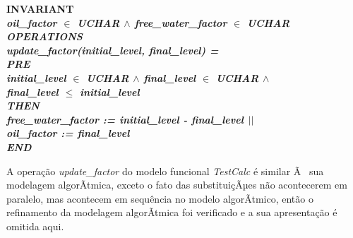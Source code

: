 \documentclass[11pt]{article} %
\begin{document}
\small{
\begin{sloppypar}
\hspace*{-0.30in}\bf INVARIANT\\
\hspace*{0.40in}\it oil\_factor  $\in$  \it UCHAR  $\land$  \it free\_water\_factor  $\in$  \it UCHAR\\
\bf OPERATIONS\\
\hspace*{0.20in}\bf update\_factor\rm (\it initial\_level\rm , \it final\_level\rm ) \rm =\\
\hspace*{0.20in}\bf PRE\\ 
\hspace*{0.40in}\it initial\_level  $\in$  \it UCHAR  $\land$  \it final\_level\hspace*{0.10in} $\in$ 
\it UCHAR  $\land$\\
\hspace*{0.40in}\it final\_level  $\leq$  \it initial\_level\\ 
\hspace*{0.20in}\bf THEN\\
\hspace*{0.40in}\it free\_water\_factor \rm := \it initial\_level \rm - \it final\_level $\mbox{$\mid\mid$}$\\ 
\hspace*{0.40in}\it oil\_factor \rm := \it final\_level\\
\hspace*{0.20in}\bf END
\end{sloppypar}
}

A operação \textit{update\_factor} do modelo funcional \textit{TestCalc} é similar Ã 
sua modelagem algorÃ­tmica, exceto o fato das substituiçÃµes não acontecerem em paralelo, mas acontecem
em sequência no modelo algorÃ­tmico, então o refinamento da modelagem algorÃ­tmica foi verificado e a sua 
apresentação é omitida aqui.
\end{document}

